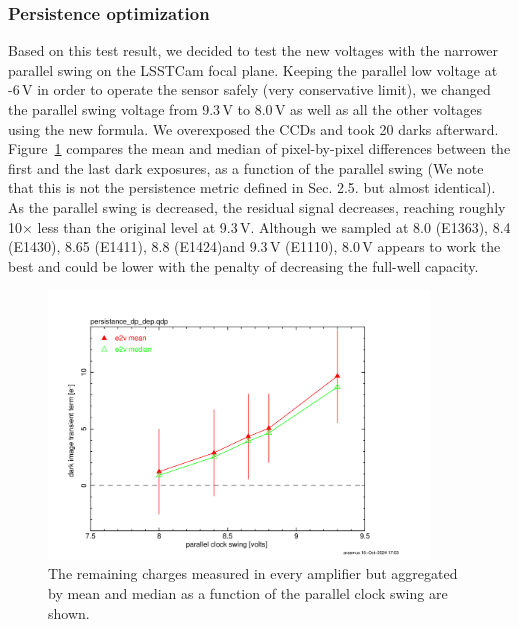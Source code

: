 \subsubsection{Persistence optimization}\label{persistence-optimization-1}
Based on this test result, we decided to test the new voltages with
the narrower parallel swing on the LSSTCam focal plane. Keeping the
parallel low voltage at -6\,V in order to operate the sensor safely (very
conservative limit), we changed the parallel swing voltage from 9.3\,V to
8.0\,V as well as all the other voltages using the new formula. We
overexposed the CCDs and took 20 darks afterward. Figure~\ref{fig:peristence-swing} compares the
mean and median of pixel-by-pixel differences between the first and the
last dark exposures, as a function of the parallel swing (We note that this is not the persistence metric defined in Sec. 2.5. but almost identical).
As the parallel swing is decreased, the residual signal decreases, reaching
roughly 10$\times$ less than the original level at 9.3\,V. Although we sampled
at 8.0 (E1363), 8.4 (E1430), 8.65 (E1411), 8.8 (E1424)and 9.3\,V (E1110), 8.0\,V appears to work the best and could
be lower with the penalty of decreasing the full-well capacity.

\begin{figure}[ht]
\begin{centering}
\includegraphics[width=0.9\textwidth]{figures/e2v_transient_dark_vs_dp.png}

\caption{The remaining charges measured in every amplifier but
aggregated by mean and median as a function of the parallel clock swing
are shown.}
\label{fig:peristence-swing}
\end{centering}
\end{figure}

